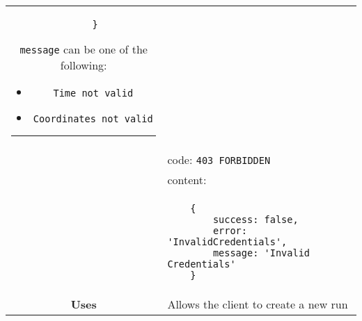\begin{adjustwidth}{1cm}{}
\begin{longtable}{|c|l|}
\begin{minipage}[t]{0.7\textwidth}
\begin{adjustwidth}{1.5cm}{}
\begin{verbatim}
    }
                    \end{verbatim}
                    \end{adjustwidth}
                    \texttt{message} can be one of the following: 
                    \begin{itemize}
                        \item \texttt{Time not valid}
                        \item \texttt{Coordinates not valid}
                    \end{itemize}
                     \par\noindent\rule{\textwidth}{1pt}
                 \vspace{4pt}
                  \end{minipage} \\
                & code: \texttt{403 FORBIDDEN} \\
                &                         content: \\
                & \begin{minipage}[t]{0.7\textwidth}
                    \begin{adjustwidth}{1.5cm}{}
                    \begin{verbatim}
    {
        success: false, 
        error: 'InvalidCredentials',
        message: 'Invalid Credentials'
    }
                    \end{verbatim}
                    \end{adjustwidth}
                  \end{minipage} \\
                  \hline
                \textbf{Uses} & Allows the client to create a new run \\
                \hline
                

\end{longtable}
\end{adjustwidth}
